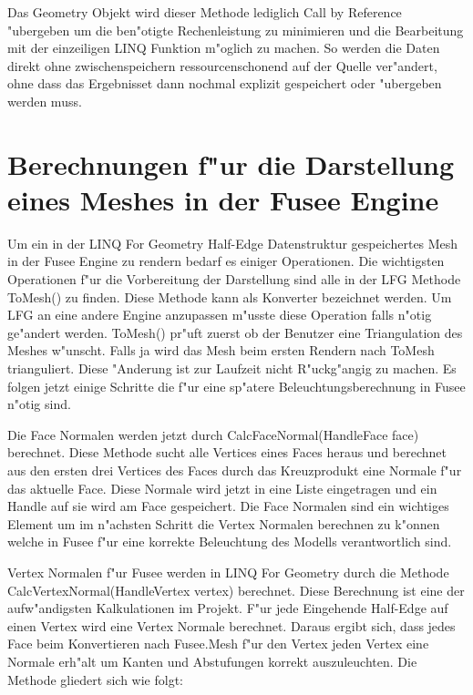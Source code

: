 \documentclass[pagesize, paper=a4, fontsize=12pt,titlepage=true, headings=small, headnosepline, abstractoff, liststotoc, nochapterprefix, plainheadsepline]{scrreprt}
\newcommand{\LFGS}{LINQ For Geometry }
\newcommand{\HES}{Half-Edge Datenstruktur }
\begin{document}
Das Geometry Objekt wird dieser Methode lediglich Call by Reference "ubergeben um die ben"otigte Rechenleistung zu minimieren und die Bearbeitung mit der einzeiligen LINQ Funktion m"oglich zu machen. So werden die Daten direkt ohne zwischenspeichern ressourcenschonend auf der Quelle ver"andert, ohne dass das Ergebnisset dann nochmal explizit gespeichert oder "ubergeben werden muss.
\newpage
	\section {Berechnungen f"ur die Darstellung eines Meshes in der Fusee Engine}
	Um ein in der \LFGS \HES gespeichertes Mesh in der Fusee Engine zu rendern bedarf es einiger Operationen. Die wichtigsten Operationen f"ur die Vorbereitung der Darstellung sind alle in der LFG Methode ToMesh() zu finden. Diese Methode kann als Konverter bezeichnet werden. Um LFG an eine andere Engine anzupassen m"usste diese Operation falls n"otig ge"andert werden. ToMesh() pr"uft zuerst ob der Benutzer eine Triangulation des Meshes w"unscht. Falls ja wird das Mesh beim ersten Rendern nach ToMesh trianguliert. Diese "Anderung ist zur Laufzeit nicht R"uckg"angig zu machen. Es folgen jetzt einige Schritte die f"ur eine sp"atere Beleuchtungsberechnung in Fusee n"otig sind.

Die Face Normalen werden jetzt durch CalcFaceNormal(HandleFace face) berechnet. Diese Methode sucht alle Vertices eines Faces heraus und berechnet aus den ersten drei Vertices des Faces durch das Kreuzprodukt eine Normale f"ur das aktuelle Face. Diese Normale wird jetzt in eine Liste eingetragen und ein Handle auf sie wird am Face gespeichert. Die Face Normalen sind ein wichtiges Element um im n"achsten Schritt die Vertex Normalen berechnen zu k"onnen welche in Fusee f"ur eine korrekte Beleuchtung des Modells verantwortlich sind.

Vertex Normalen f"ur Fusee werden in \LFGS durch die Methode CalcVertexNormal(HandleVertex vertex) berechnet. Diese Berechnung ist eine der aufw"andigsten Kalkulationen im Projekt. F"ur jede Eingehende Half-Edge auf einen Vertex wird eine Vertex Normale berechnet. Daraus ergibt sich, dass jedes Face beim Konvertieren nach Fusee.Mesh f"ur den Vertex jeden Vertex eine Normale erh"alt um Kanten und Abstufungen korrekt auszuleuchten. Die Methode gliedert sich wie folgt:
\end{document}
